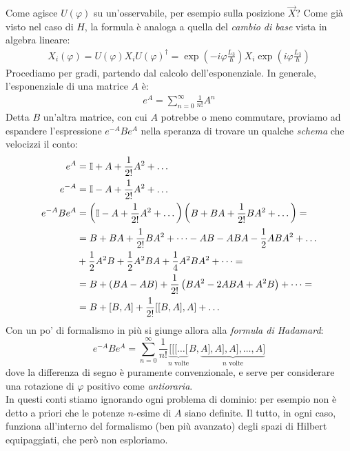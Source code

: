 \documentclass[../../FisicaTeorica.tex]{subfiles}
\begin{document}
Come agisce $U(\varphi)$ su un'osservabile, per esempio sulla posizione $\vec{X}$? Come già visto nel caso di $H$, la formula è analoga a quella del \textit{cambio di base} vista in algebra lineare:
\begin{align*}
X_i(\varphi) =U(\varphi) X_i U(\varphi)^\dag = \exp \left( -i\varphi\frac{L_3}{\hbar}\right) X_i \exp\left(i\varphi\frac{L_3}{\hbar}\right)
\end{align*}
Procediamo per gradi, partendo dal calcolo dell'esponenziale. In generale, l'esponenziale di una matrice $A$ è:
\begin{align*}
e^A = \sum_{n=0}^{\infty}\frac{1}{n!}A^n
\end{align*}
Detta $B$ un'altra matrice, con cui $A$ potrebbe o meno commutare, proviamo ad espandere l'espressione $e^{-A}B e^A$ nella speranza di trovare un qualche \textit{schema} che velocizzi il conto:
\begin{align*}
e^A &= \mathbb{I} + A + \frac{1}{2!} A^2 + \dots\\
e^{-A} &= \mathbb{I} - A + \frac{1}{2!}A^2 + \dots\\
e^{-A}B e^A &= \left(
\mathbb{I} - A + \frac{1}{2!}A^2 + \dots
\right)\left(B + BA + \frac{1}{2!}BA^2 + \dots \right) =\\
&=B+BA + \frac{1}{2!}BA^2 + \dots - AB -ABA -\frac{1}{2}ABA^2 + \dots \\
&+ \frac{1}{2} A^2 B + \frac{1}{2}A^2BA + \frac{1}{4}A^2BA^2 + \dots =\\
&=B + \left(BA-AB\right) +\frac{1}{2!}\left(BA^2 - 2ABA +A^2B\right) +\dots =\\
&=B + [B,A] +\frac{1}{2!} [[B,A],A] + \dots
\end{align*}
Con un po' di formalismo in più si giunge allora alla \textit{formula di Hadamard}:
\[
e^{-A} B e^A = \sum_{n=0}^\infty \frac{1}{n!} \underbrace{[[[\dots [}_{n \text{ volte}}B,\underbrace{A],A],A],\dots,A]}_{n \text{ volte}}
\]
dove la differenza di segno è puramente convenzionale, e serve per considerare una rotazione di $\varphi$ positivo come \textit{antioraria}.\\
In questi conti stiamo ignorando ogni problema di dominio: per esempio non è detto a priori che le potenze $n$-esime di $A$ siano definite. Il tutto, in ogni caso, funziona all'interno del formalismo (ben più avanzato) degli spazi di Hilbert equipaggiati, che però non esploriamo.\\
\end{document}
